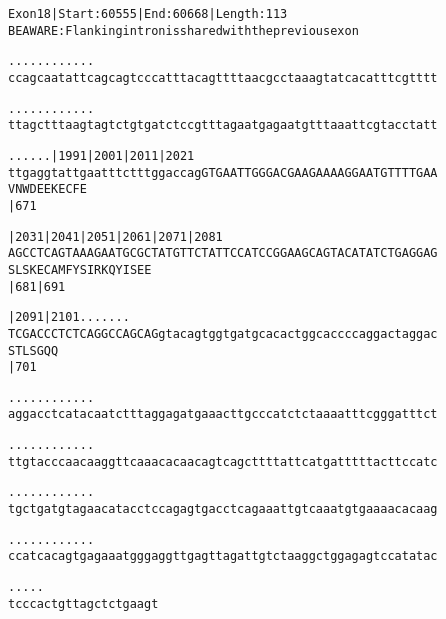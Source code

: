 \documentclass{article}
\begin{document}
\begin{alltt}
Exon 18 | Start: 60555 | End: 60668 | Length: 113
BE AWARE: Flanking intron is shared with the previous exon

.    .    .    .    .    .    .    .    .    .    .    .    
ccagcaatattcagcagtcccatttacagttttaacgcctaaagtatcacatttcgtttt

.    .    .    .    .    .    .    .    .    .    .    .    
ttagctttaagtagtctgtgatctccgtttagaatgagaatgtttaaattcgtacctatt

.    .    .    .    .    .  |1991     |2001     |2011     |2021
ttgaggtattgaatttctttggaccagGTGAATTGGGACGAAGAAAAGGAATGTTTTGAA
                           V  N  W  D  E  E  K  E  C  F  E  
                                                |671        

        |2031     |2041     |2051     |2061     |2071     |2081
AGCCTCAGTAAAGAATGCGCTATGTTCTATTCCATCCGGAAGCAGTACATATCTGAGGAG
S  L  S  K  E  C  A  M  F  Y  S  I  R  K  Q  Y  I  S  E  E  
                  |681                          |691        

        |2091     |2101  .    .    .    .    .    .    .    
TCGACCCTCTCAGGCCAGCAGgtacagtggtgatgcacactggcaccccaggactaggac
S  T  L  S  G  Q  Q                                         
                  |701                                      

.    .    .    .    .    .    .    .    .    .    .    .    
aggacctcatacaatctttaggagatgaaacttgcccatctctaaaatttcgggatttct

.    .    .    .    .    .    .    .    .    .    .    .    
ttgtacccaacaaggttcaaacacaacagtcagcttttattcatgatttttacttccatc

.    .    .    .    .    .    .    .    .    .    .    .    
tgctgatgtagaacatacctccagagtgacctcagaaattgtcaaatgtgaaaacacaag

.    .    .    .    .    .    .    .    .    .    .    .    
ccatcacagtgagaaatgggaggttgagttagattgtctaaggctggagagtccatatac

.    .    .    .    .
tcccactgttagctctgaagt
\end{alltt}
\newpage
\end{document}
